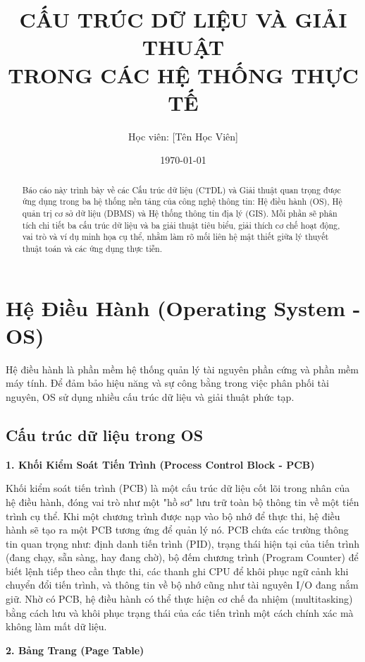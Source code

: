 \documentclass[a4paper,12pt]{article}
\title{\textbf{CẤU TRÚC DỮ LIỆU VÀ GIẢI THUẬT\\TRONG CÁC HỆ THỐNG THỰC TẾ}}
\author{Học viên: [Tên Học Viên]}
\date{\today}
\begin{document}
\maketitle

\begin{abstract}
Báo cáo này trình bày về các Cấu trúc dữ liệu (CTDL) và Giải thuật quan trọng được ứng dụng trong ba hệ thống nền tảng của công nghệ thông tin: Hệ điều hành (OS), Hệ quản trị cơ sở dữ liệu (DBMS) và Hệ thống thông tin địa lý (GIS). Mỗi phần sẽ phân tích chi tiết ba cấu trúc dữ liệu và ba giải thuật tiêu biểu, giải thích cơ chế hoạt động, vai trò và ví dụ minh họa cụ thể, nhằm làm rõ mối liên hệ mật thiết giữa lý thuyết thuật toán và các ứng dụng thực tiễn.
\end{abstract}

\tableofcontents
\newpage

\section{Hệ Điều Hành (Operating System - OS)}

Hệ điều hành là phần mềm hệ thống quản lý tài nguyên phần cứng và phần mềm máy tính. Để đảm bảo hiệu năng và sự công bằng trong việc phân phối tài nguyên, OS sử dụng nhiều cấu trúc dữ liệu và giải thuật phức tạp.

\subsection{Cấu trúc dữ liệu trong OS}

\textbf{1. Khối Kiểm Soát Tiến Trình (Process Control Block - PCB)}

Khối kiểm soát tiến trình (PCB) là một cấu trúc dữ liệu cốt lõi trong nhân của hệ điều hành, đóng vai trò như một "hồ sơ" lưu trữ toàn bộ thông tin về một tiến trình cụ thể. Khi một chương trình được nạp vào bộ nhớ để thực thi, hệ điều hành sẽ tạo ra một PCB tương ứng để quản lý nó. PCB chứa các trường thông tin quan trọng như: định danh tiến trình (PID), trạng thái hiện tại của tiến trình (đang chạy, sẵn sàng, hay đang chờ), bộ đếm chương trình (Program Counter) để biết lệnh tiếp theo cần thực thi, các thanh ghi CPU để khôi phục ngữ cảnh khi chuyển đổi tiến trình, và thông tin về bộ nhớ cũng như tài nguyên I/O đang nắm giữ. Nhờ có PCB, hệ điều hành có thể thực hiện cơ chế đa nhiệm (multitasking) bằng cách lưu và khôi phục trạng thái của các tiến trình một cách chính xác mà không làm mất dữ liệu.

\textbf{2. Bảng Trang (Page Table)}
\end{document}

